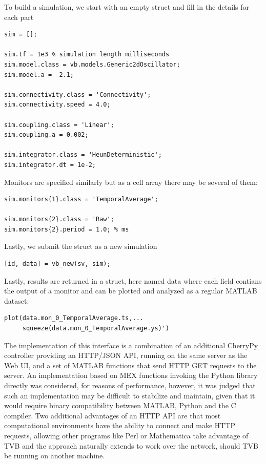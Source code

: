 To build a simulation, we start with an empty struct
and fill in the details for each part

\begin{lstlisting}
sim = [];

sim.tf = 1e3 % simulation length milliseconds
sim.model.class = vb.models.Generic2dOscillator;
sim.model.a = -2.1;

sim.connectivity.class = 'Connectivity';
sim.connectivity.speed = 4.0;

sim.coupling.class = 'Linear';
sim.coupling.a = 0.002;

sim.integrator.class = 'HeunDeterministic';
sim.integrator.dt = 1e-2;
\end{lstlisting}

Monitors are specified similarly but as a cell array there may be
several of them:

\begin{lstlisting}
sim.monitors{1}.class = 'TemporalAverage';

sim.monitors{2}.class = 'Raw';
sim.monitors{2}.period = 1.0; % ms
\end{lstlisting}


Lastly, we submit the struct as a new simulation

\begin{lstlisting}
[id, data] = vb_new(sv, sim);
\end{lstlisting}

\noindent Lastly, results are returned in a struct, here named data
where each field contians the output of a monitor and can be plotted
and analyzed as a regular MATLAB dataset:

\begin{lstlisting}
plot(data.mon_0_TemporalAverage.ts,...
     squeeze(data.mon_0_TemporalAverage.ys)')
\end{lstlisting}

The implementation of this interface is a combination of an additional
CherryPy controller providing an HTTP/JSON API, running on the same 
server as the Web UI, and a set of MATLAB functions that send HTTP 
GET requests to the server. An implementation based on MEX functions 
invoking the Python library directly was considered, for reasons of 
performance, however, it was judged that such an implementation may be
difficult to stabilize and maintain, given that it would require binary
compatibility between MATLAB, Python and the C compiler. Two additional 
advantages of an HTTP API are that most computational environments have
the ability to connect and make HTTP requests, allowing other programs 
like Perl or Mathematica take advantage of TVB and the approach naturally
extends to work over the network, should TVB be running on another machine.



